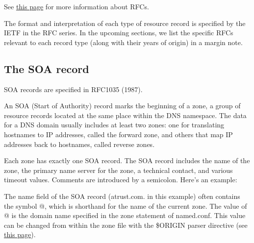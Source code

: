 \leavevmode\hypertarget{part0024_split_021.htmlux5cux23_idContainer934}{}%
See
\protect\hyperlink{part0021_split_003.htmlux5cux23_idTextAnchor618}{this
page} for more information about RFCs.

The format and interpretation of each type of resource record is
specified by the IETF in the RFC series. In the upcoming sections, we
list the specific RFCs relevant to each record type (along with their
years of origin) in a margin note.

\protect\hypertarget{part0024_split_022.html}{}{}

\hypertarget{part0024_split_022.htmlux5cux23_idContainer1069}{}
\hypertarget{part0024_split_022.htmlux5cux23calibre_pb_21}{%
\subsection[The SOA
record]{\texorpdfstring{\protect\hypertarget{part0024_split_022.htmlux5cux23_idTextAnchor873}{}{}The
SOA
record}{The SOA record}}\label{part0024_split_022.htmlux5cux23calibre_pb_21}}

\leavevmode\hypertarget{part0024_split_022.htmlux5cux23_idContainer935}{}%
SOA records are specified in RFC1035 (1987).

An
\protect\hypertarget{part0024_split_022.htmlux5cux23_idIndexMarker2068}{}{}\protect\hypertarget{part0024_split_022.htmlux5cux23_idIndexMarker2069}{}{}SOA
(Start of Authority) record marks the beginning of a zone, a group of
resource records located at the same place within the DNS namespace. The
data for a DNS domain usually includes at least two zones: one for
translating hostnames to IP addresses, called the forward zone, and
others that map IP addresses back to hostnames, called reverse zones.

Each zone has exactly one SOA record. The SOA record includes the name
of the zone, the primary name server for the zone, a technical contact,
and various timeout values. Comments are introduced by a semicolon.
Here's an example:


The {name} field of the SOA record (atrust.com. in this example) often
contains the symbol {@}, which is shorthand for the name of the current
zone. The value of {@} is the domain name specified in the {zone}
statement of {named.conf}. This value can be changed from within the
zone file with the {\$ORIGIN} parser directive (see
\protect\hyperlink{part0024_split_020.htmlux5cux23_idTextAnchor867}{this
page}).

